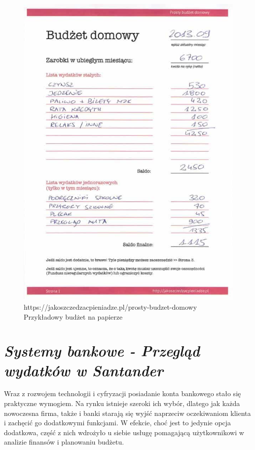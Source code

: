 \documentclass[a4paper, 10pt, twoside, openright]{report}
\newcommand{\customstylesection}[1]{\textbf{\textit{#1}}}
\begin{document}
\begin{large}
\begin{figure}[H]           %
    \centering
    \includegraphics[width=12cm]{figures/jakoszczedzacpieniadze.pl_budzet-domowy-1.jpg}
    \caption{https://jakoszczedzacpieniadze.pl/prosty-budzet-domowy Przykładowy budżet na papierze}
    \label{fig:budzetprzykladowypapier}
\end{figure}

\section{\customstylesection{Systemy bankowe - Przegląd wydatków w Santander}}
{Wraz z rozwojem technologii i cyfryzacji posiadanie konta bankowego stało się 
praktyczne wymogiem. Na rynku istnieje szeroki ich wybór, dlatego jak każda 
nowoczesna firma, także i banki starają się wyjść naprzeciw oczekiwaniom 
klienta i zachęcić go dodatkowymi funkcjami. W efekcie, choć jest to jedynie 
opcja dodatkowa, część z nich wdrożyło u siebie usługę pomagającą użytkownikowi 
w analizie finansów i planowaniu budżetu.}


\end{large}
\end{document}
